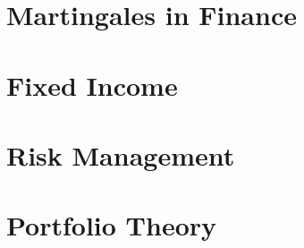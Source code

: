 \section{Martingales in Finance}






\section{Fixed Income}






\section{Risk Management}





\section{Portfolio Theory}




